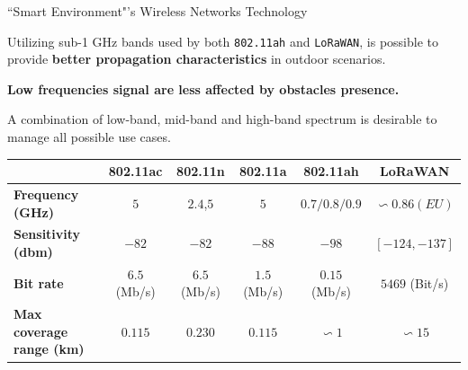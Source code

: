 \documentclass[10pt]{beamer}
\begin{document}
\begin{frame}{``Smart Environment"'s Wireless Networks Technology}

\begin{block}{}
\justifying
Utilizing sub-1 GHz bands used by both \texttt{802.11ah} and \texttt{LoRaWAN}, is possible to provide \textbf{better  propagation characteristics} in outdoor scenarios. 

\textbf{Low frequencies signal are less affected by obstacles presence.}
\end{block}

\begin{block}{}
A combination of low-band, mid-band and high-band spectrum is desirable to manage all possible use cases.
\end{block}

\begin{adjustbox}{width=\columnwidth,center}
\begin{tabular}{l|ccccc}

& \textbf{802.11ac} & \textbf{802.11n} & \textbf{802.11a} & \textbf{802.11ah} & \textbf{LoRaWAN} \\
\hline
\textbf{Frequency (GHz)} & $5$ & $2.4$,$5$ & $5$ & $0.7/0.8/0.9$ & $\backsim 0.86 (EU)$ \\
\textbf{Sensitivity (dbm)} & $-82$ & $-82$ & $-88$ & $-98$ &  $[-124,-137]$ \\
\textbf{Bit rate} & $6.5$ (Mb/s) & $6.5$ (Mb/s) & $1.5$ (Mb/s) & $0.15$ (Mb/s) & $5469$ (Bit/s) \\
\textbf{Max coverage range (km)} & $0.115$ & $0.230$ & $0.115$ & $\backsim 1$ & $\backsim 15$ \\

\end{tabular}
\end{adjustbox}


\end{frame} 
\end{document}
